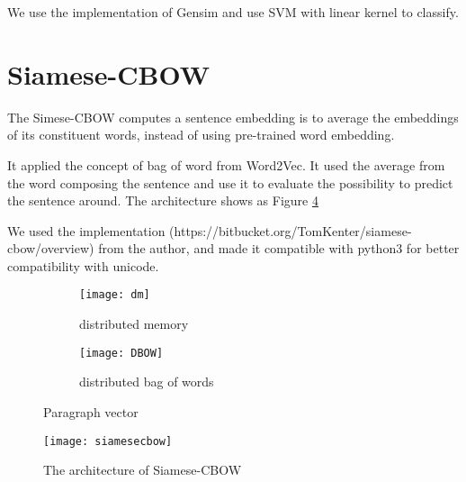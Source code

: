 We use the implementation of Gensim and use SVM with linear kernel to classify.

\section{Siamese-CBOW}

	The Simese-CBOW\cite{kenter2016siamesecbow} computes a sentence embedding is to average the embeddings of its
constituent words, instead of using pre-trained word embedding. 

It applied the concept of bag of word from Word2Vec. It used the average from the word composing the sentence and use it to evaluate the possibility to predict the sentence around. 
The architecture shows as Figure \ref{fig:siamese}

We used the implementation (https://bitbucket.org/TomKenter/siamese-cbow/overview) from the author, and made it compatible with python3 for better compatibility with unicode.


\begin{figure}
\centering
\begin{subfigure}{.5\textwidth}
  \centering
  \texttt{[image: dm]}
  \caption{distributed memory}
  \label{fig:dm}
\end{subfigure}%
\begin{subfigure}{.5\textwidth}
  \centering
  \texttt{[image: DBOW]}
  \caption{distributed bag of words}
  \label{fig:dbow}
\end{subfigure}
\caption{Paragraph vector}
\label{fig:PVDM}
\end{figure}

\begin{figure}[h]
    \centering
	\texttt{[image: siamesecbow]}
    \caption{The architecture of Siamese-CBOW}
    \label{fig:siamese}
\end{figure}
